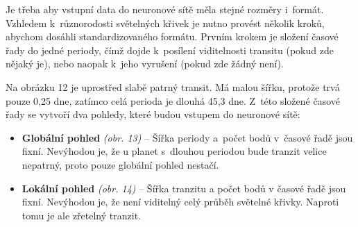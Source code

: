 \documentclass[a4paper,12pt]{article}
\begin{document}
{{\begin{multicols}{2}
\end{multicols}

\begin{multicols}{2}
\end{multicols}

Je třeba aby vstupní data do neuronové sítě měla stejné rozměry i~formát. Vzhledem k~různorodosti světelných křivek je nutno provést několik kroků, abychom dosáhli standardizovaného formátu. Prvním krokem je složení časové řady do jedné periody, čímž dojde k~posílení viditelnosti transitu (pokud zde nějaký je), nebo naopak k~jeho vyrušení (pokud zde žádný není).~\cite{kepler80}

\begin{multicols}{2}
\end{multicols}

\vspace{\fill}

Na obrázku 12 je uprostřed slabě patrný transit. Má malou šířku, protože trvá pouze 0,25 dne, zatímco celá perioda je dlouhá 45,3 dne. Z~této složené časové řady se vytvoří dva pohledy, které budou vstupem do neuronové sítě:

\begin{itemize}
\item \textbf{Globální pohled} \emph{(obr. 13)} -- Šířka periody a~počet bodů v~časové řadě jsou fixní. Nevýhodou je, že u planet s~dlouhou periodou bude tranzit velice nepatrný, proto pouze globální pohled nestačí.~\cite{kepler80}
\item \textbf{Lokální pohled} \emph{(obr. 14)} -- Šířka tranzitu a počet bodů v časové řadě jsou fixní. Nevýhodou je, že není viditelný celý průběh světelné křivky. Naproti tomu je ale zřetelný tranzit.~\cite{kepler80}
\end{itemize}

\begin{multicols}{2}
\nasa
\end{multicols}

}}
\end{document}
